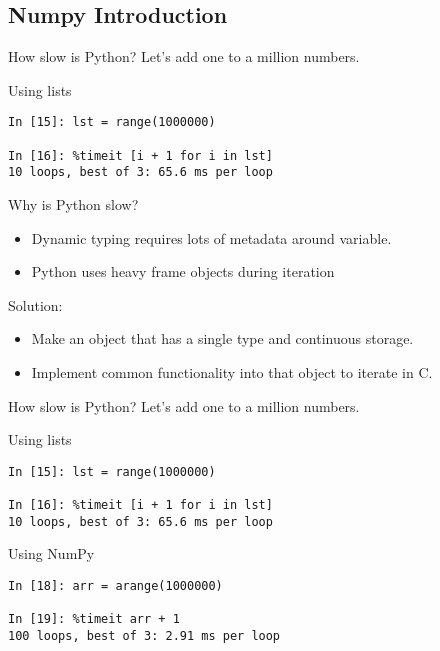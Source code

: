 \subsection*{Numpy Introduction}

\begin{frame}[fragile]
How slow is Python?  Let's add one to a million numbers.

\begin{block}{Using lists}
\begin{verbatim}
In [15]: lst = range(1000000)

In [16]: %timeit [i + 1 for i in lst]
10 loops, best of 3: 65.6 ms per loop
\end{verbatim}
\end{block}
\end{frame}

\begin{frame}
  Why is Python slow?
  \begin{itemize}
  \item Dynamic typing requires lots of metadata around variable.
  \item Python uses heavy frame objects during iteration
  \end{itemize}
  Solution:
  \begin{itemize}
    \item Make an object that has a single type and continuous storage.
    \item Implement common functionality into that object to iterate in C.
  \end{itemize}
\end{frame}

\begin{frame}[fragile]
How slow is Python?  Let's add one to a million numbers.

\begin{block}{Using lists}
\begin{verbatim}
In [15]: lst = range(1000000)

In [16]: %timeit [i + 1 for i in lst]
10 loops, best of 3: 65.6 ms per loop
\end{verbatim}
\end{block}

\begin{block}{Using NumPy}
\begin{verbatim}
In [18]: arr = arange(1000000)

In [19]: %timeit arr + 1
100 loops, best of 3: 2.91 ms per loop
\end{verbatim}
\end{block}

\end{frame}



